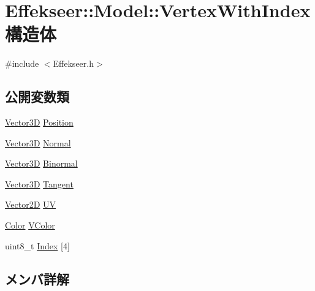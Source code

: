 \hypertarget{struct_effekseer_1_1_model_1_1_vertex_with_index}{}\section{Effekseer\+:\+:Model\+:\+:Vertex\+With\+Index 構造体}
\label{struct_effekseer_1_1_model_1_1_vertex_with_index}


{\ttfamily \#include $<$Effekseer.\+h$>$}

\subsection*{公開変数類}
\begin{DoxyCompactItemize}
\item 
\mbox{\hyperlink{struct_effekseer_1_1_vector3_d}{Vector3D}} \mbox{\hyperlink{struct_effekseer_1_1_model_1_1_vertex_with_index_a22384cf486e5836ecaa7e44223d48030}{Position}}
\item 
\mbox{\hyperlink{struct_effekseer_1_1_vector3_d}{Vector3D}} \mbox{\hyperlink{struct_effekseer_1_1_model_1_1_vertex_with_index_a62d6f178cabfca2b4804db18808d1f42}{Normal}}
\item 
\mbox{\hyperlink{struct_effekseer_1_1_vector3_d}{Vector3D}} \mbox{\hyperlink{struct_effekseer_1_1_model_1_1_vertex_with_index_ab5eaf1806d47de81ab10b5c0dc657e33}{Binormal}}
\item 
\mbox{\hyperlink{struct_effekseer_1_1_vector3_d}{Vector3D}} \mbox{\hyperlink{struct_effekseer_1_1_model_1_1_vertex_with_index_a851f79cd3d0e50a5e8dd6e0cec83d7bf}{Tangent}}
\item 
\mbox{\hyperlink{struct_effekseer_1_1_vector2_d}{Vector2D}} \mbox{\hyperlink{struct_effekseer_1_1_model_1_1_vertex_with_index_a38ec916ab361fc5ce55283cf6e89c941}{UV}}
\item 
\mbox{\hyperlink{struct_effekseer_1_1_color}{Color}} \mbox{\hyperlink{struct_effekseer_1_1_model_1_1_vertex_with_index_aff987e0ba3b15c7682072f054860d2bc}{V\+Color}}
\item 
uint8\+\_\+t \mbox{\hyperlink{struct_effekseer_1_1_model_1_1_vertex_with_index_aa9ba7ef223b374fd22c07b0be4a89ee2}{Index}} \mbox{[}4\mbox{]}
\end{DoxyCompactItemize}


\subsection{メンバ詳解}
\mbox{\label{struct_effekseer_1_1_model_1_1_vertex_with_index_ab5eaf1806d47de81ab10b5c0dc657e33}} 
